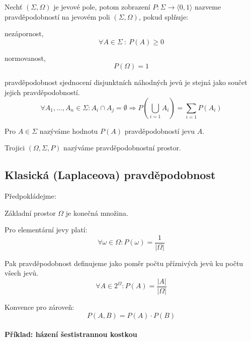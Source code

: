 \begin{compactitem}
    \item Nechť $(\Sigma, \Omega)$ je jevové pole, potom zobrazení $P : \Sigma \rightarrow \langle 0, 1 \rangle$ nazveme pravděpodobností na jevovém poli $(\Sigma, \Omega)$, pokud splňuje: \begin{compactitem}
        \item nezápornost,
        $$\forall A \in \Sigma ~:~ P(A) \geq 0$$
        \item normovanost,
        $$ P(\Omega) = 1 $$
        \item pravděpodobnost sjednocení disjunktních náhodných jevů je stejná jako součet jejich pravděpodobností.
        $$ \forall A_1, \ldots, A_n \in \Sigma : A_i \cap A_j = \emptyset \Rightarrow P \left( \bigcup_{i=1} A_i \right) = \sum_{i=1} P(A_i) $$
    \end{compactitem}

    \item Pro $A \in \Sigma$ nazýváme hodnotu $P(A)$ pravděpodobností jevu $A$.

    \item Trojici $ (\Omega, \Sigma, P) $ nazýváme pravděpodobnostní prostor.
\end{compactitem}

\subsection{Klasická (Laplaceova) pravděpodobnost}

\begin{compactitem}
    \item Předpokládejme: \begin{compactitem}
        \item Základní prostor $\Omega$ je konečná množina.
        \item Pro elementární jevy platí:
        $$\forall \omega \in \Omega : P(\omega) = \frac{1}{|\Omega|}$$
    \end{compactitem}

    \item Pak pravděpodobnost definujeme jako poměr počtu příznivých jevů ku počtu všech jevů.
    $$ \forall A \in 2^{\Omega} : P(A) = \frac{|A|}{|\Omega|} $$

    \item Konvence pro zároveň:
    $$ P(A, B) = P(A) \cdot P(B) $$
\end{compactitem}

\paragraph*{Příklad: házení šestistrannou kostkou}

